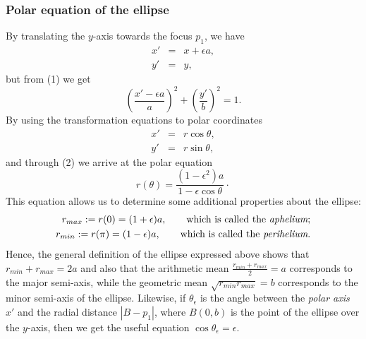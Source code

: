 \documentclass[12pt]{article}
\begin{document}
\subsubsection*{Polar equation of the ellipse}
By translating the $y$-axis towards the focus $p_1$, we have
\begin{eqnarray*}
x' &=& x+\epsilon a,  \\
y' &=& y,
\end{eqnarray*}
but from (1) we get
\begin{equation}
\left(\frac{x'-\epsilon a}{a}\right)^2 + \left(\frac{y'}{b}\right)^2 = 1.
\end{equation}
By using the transformation equations to polar coordinates
\begin{eqnarray*}
x' &=& r\cos\theta, \\
y' &=& r\sin\theta,
\end{eqnarray*}
and through (2) we arrive at the polar equation
\begin{equation}
r(\theta)=\frac{(1-\epsilon^2)a}{1-\epsilon\cos\theta}\cdot
\end{equation}
This equation allows us to determine some additional properties about the ellipse: 
\begin{align*}
r_{max}:=r(0)=(1+\epsilon)a, \qquad \text{which is called the {\em aphelium}}; \\
r_{min}:=r(\pi)=(1-\epsilon)a, \qquad \text{which is called the {\em perihelium}}.
\end{align*}
Hence, the general definition of the ellipse expressed above shows that $r_{min}+r_{max}=2a$ and also that the arithmetic mean $\displaystyle \frac{r_{min}+r_{max}}{2}=a$ corresponds to the major semi-axis, while the geometric mean $\sqrt{r_{min}r_{max}}=b$ corresponds to the minor semi-axis of the ellipse. Likewise, if $\theta_\epsilon$ is the angle between the {\em polar axis} $x'$ and the radial distance $|B-p_1|$, where $B(0,b)$ is the point of the ellipse over the $y$-axis, then we get the useful equation $\cos\theta_\epsilon=\epsilon$.
\end{document}
